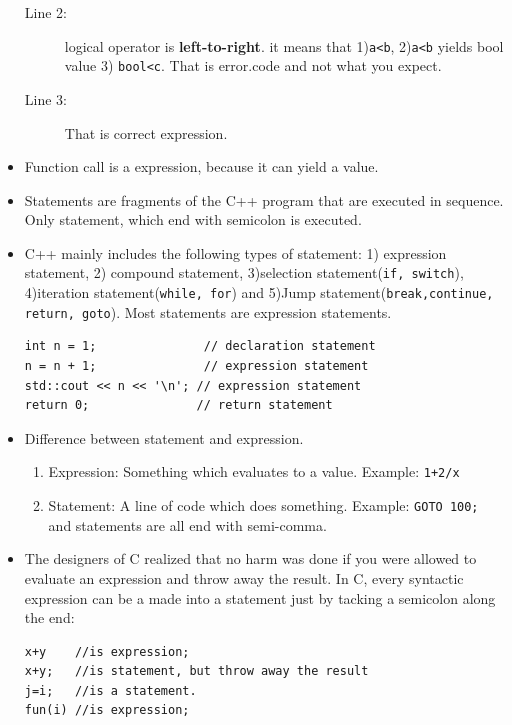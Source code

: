 \documentclass[a4paper,11pt,twoside]{book}
\begin{document}
\begin{itemize}
\begin{description}
	\item[Line 2:] logical operator is \textbf{left-to-right}. it means that 1)\texttt{a<b}, 2)\texttt{a<b} yields bool value 3) \texttt{bool<c}. That is error.code and not what you expect.  
	
	\item[Line 3:] That is correct expression.
\end{description}

	\item Function call is a expression, because it can yield a value.


	\item Statements are fragments of the C++ program that are executed in sequence. Only statement, which end with semicolon is executed.
	
	\item C++ mainly includes the following types of statement: 1) expression statement, 2) compound statement, 3)selection statement(\texttt{if, switch}), 4)iteration statement(\texttt{while, for}) and 5)Jump statement(\texttt{break,continue, return, goto}). Most statements are expression statements. 
\begin{lstlisting}[numbers=none]
int n = 1;               // declaration statement
n = n + 1;               // expression statement
std::cout << n << '\n'; // expression statement
return 0;               // return statement
\end{lstlisting}
	
\item Difference between statement and expression.
	\begin{enumerate}
		\item Expression: Something which evaluates to a value. Example: \texttt{1+2/x}
		\item Statement: A line of code which does something. Example: \texttt{GOTO 100;} and statements are all end with semi-comma.
	\end{enumerate}
	
	
	\item The designers of C realized that no harm was done if you were allowed to evaluate an expression and throw away the result. In C, every syntactic expression can be a made into a statement just by tacking a semicolon along the end:
	
\begin{lstlisting}[numbers=none]
x+y    //is expression;
x+y;   //is statement, but throw away the result
j=i;   //is a statement.
fun(i) //is expression;
\end{lstlisting} 

\end{itemize}
\end{document}
